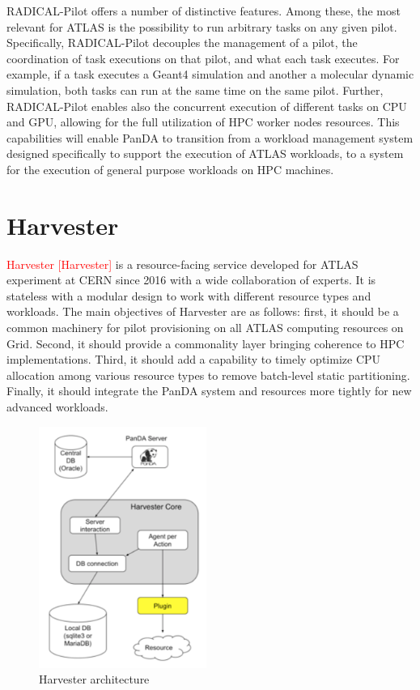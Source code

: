 \documentclass{webofc}
\begin{document}
RADICAL-Pilot offers a number of distinctive features. Among these, the most
relevant for ATLAS is the possibility to run arbitrary tasks on any given
pilot. Specifically, RADICAL-Pilot decouples the management of a pilot, the
coordination of task executions on that pilot, and what each task executes.
For example, if a task executes a Geant4 simulation and another a molecular
dynamic simulation, both tasks can run at the same time on the same pilot.
Further, RADICAL-Pilot enables also the concurrent execution of different
tasks on CPU and GPU, allowing for the full utilization of HPC worker nodes
resources. This capabilities will enable PanDA to transition from a workload
management system designed specifically to support the execution of ATLAS
workloads, to a system for the execution of general purpose workloads on HPC
machines.


\section{Harvester}

\textcolor{red}{Harvester [Harvester]} is a resource-facing service developed for ATLAS
experiment at CERN since 2016 with a wide collaboration of experts.  It is
stateless with a modular design to work with different resource types and
workloads. The main objectives of Harvester are as follows: first, it should
be a common machinery for pilot provisioning on all ATLAS computing resources
on Grid. Second, it should provide a commonality layer bringing coherence to
HPC implementations. Third, it should add a capability to timely optimize CPU
allocation among various resource types to remove batch-level static
partitioning. Finally, it should integrate the PanDA system and resources
more tightly for new advanced workloads.

\begin{figure}
	\centering
	\includegraphics[width=0.49\textwidth]{figures/panda-harvester-overview.pdf}
	\caption{Harvester architecture}
	\label{fig:harvester-architecture}
\end{figure}
\end{document}
